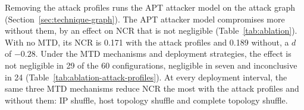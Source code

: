 \documentclass{cshonours}
\begin{document}
Removing the attack profiles runs the APT attacker model on the attack graph
(Section~\ref{sec:technique-graph}). The APT attacker model compromises more
without them, by an effect on NCR that is not negligible
(Table~\ref{tab:ablation}). With no MTD, its NCR is 0.171 with the attack
profiles and 0.189 without, a $d$ of $-0.28$. Under the MTD mechanisms and
deployment strategies, the effect is not negligible in 29 of the 60
configurations, negligible in seven and inconclusive in 24
(Table~\ref{tab:ablation-attack-profiles}).
At every deployment interval, the same three MTD mechanisms reduce NCR the
most with the attack profiles and without them: IP shuffle, host topology
shuffle and complete topology shuffle.
\end{document}
